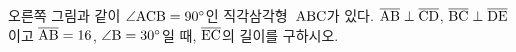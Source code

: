 \noindent\begin{minipage}[t]{0.58\linewidth}\vspace{0pt}\raggedright 오른쪽 그림과 같이 $\angle\mathrm{ACB}=90^\circ$인 직각삼각형~$\mathrm{ABC}$가 있다. $\overline{\mathrm{AB}}\perp\overline{\mathrm{CD}}$, $\overline{\mathrm{BC}}\perp\overline{\mathrm{DE}}$이고 $\overline{\mathrm{AB}}=16$, $\angle\mathrm{B}=30^\circ$일 때, $\overline{\mathrm{EC}}$의 길이를 구하시오.\end{minipage}\hfill\begin{minipage}[t]{0.4\linewidth}\vspace{0pt}\centering \resizebox{\ifdim\width>\linewidth\linewidth\else\width\fi}{!}{}\end{minipage}\par
